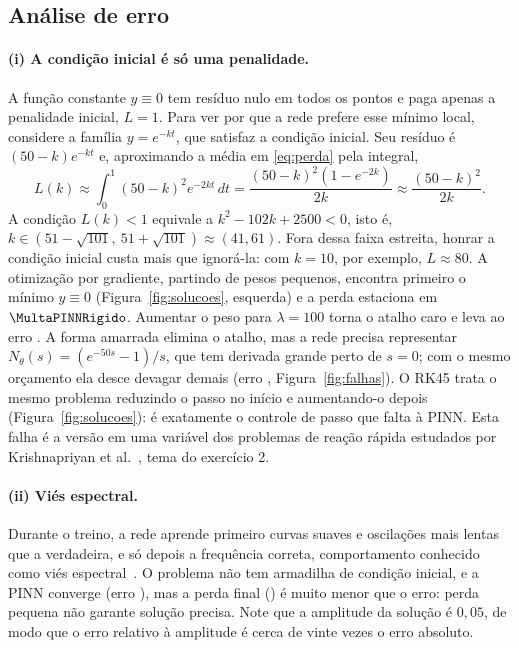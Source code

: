 \subsection{Análise de erro}

\paragraph{(i) A condição inicial é só uma penalidade.} A função constante $y \equiv 0$ tem resíduo nulo em todos os
pontos e paga apenas a penalidade inicial, $L = 1$. Para ver por que a rede prefere esse mínimo local, considere a
família $y = e^{-kt}$, que satisfaz a condição inicial. Seu resíduo é $(50-k)e^{-kt}$ e, aproximando a média em
\eqref{eq:perda} pela integral,
\begin{equation}
  L(k) \approx \int_0^1 (50-k)^2 e^{-2kt}\,dt = \frac{(50-k)^2 (1 - e^{-2k})}{2k} \approx \frac{(50-k)^2}{2k}.
\end{equation}
A condição $L(k) < 1$ equivale a $k^2 - 102k + 2500 < 0$, isto é, $k \in (51 - \sqrt{101},\ 51 + \sqrt{101})
\approx (41, 61)$. Fora dessa faixa estreita, honrar a condição inicial custa mais que ignorá-la: com $k = 10$, por
exemplo, $L \approx 80$. A otimização por gradiente, partindo de pesos pequenos, encontra primeiro o mínimo $y \equiv 0$
(Figura~\ref{fig:solucoes}, esquerda) e a perda estaciona em $\MultaPINNRigido$. Aumentar o peso para $\lambda = 100$
torna o atalho caro e leva ao erro \ErroPINNRigidoPeso. A forma amarrada elimina o atalho, mas a rede precisa
representar $N_\theta(s) = (e^{-50s} - 1)/s$, que tem derivada grande perto de $s = 0$; com o mesmo orçamento ela
desce devagar demais (erro \ErroPINNRigidoAmarrada, Figura~\ref{fig:falhas}). O RK45 trata o mesmo problema reduzindo o
passo no início e aumentando-o depois (Figura~\ref{fig:solucoes}): é exatamente o controle de passo que falta à PINN.
Esta falha é a versão em uma variável dos problemas de reação rápida estudados por Krishnapriyan et
al.~\cite{krishnapriyan2021}, tema do exercício 2.

\paragraph{(ii) Viés espectral.} Durante o treino, a rede aprende primeiro curvas suaves e oscilações mais lentas que a
verdadeira, e só depois a frequência correta, comportamento conhecido como viés espectral~\cite{rahaman2019}. O
problema não tem armadilha de condição inicial, e a PINN converge (erro \ErroPINNOscilante), mas a perda final
(\MultaPINNOscilante) é muito menor que o erro: perda pequena não garante solução precisa. Note que a amplitude da
solução é $0{,}05$, de modo que o erro relativo à amplitude é cerca de vinte vezes o erro absoluto.


